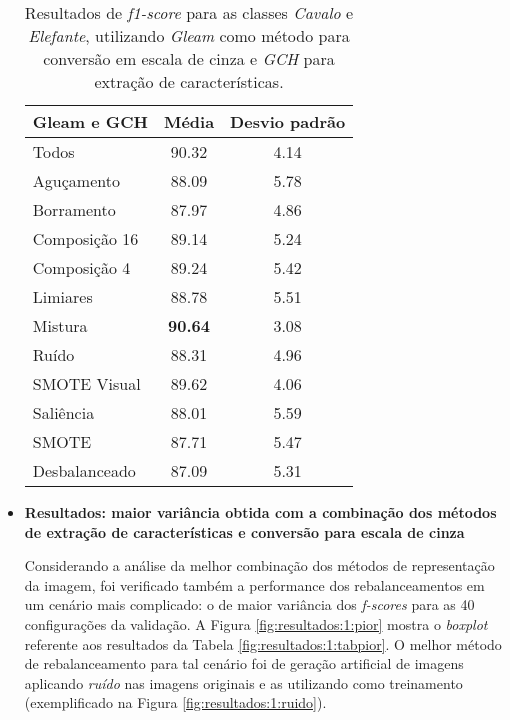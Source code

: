 \begin{itemize}
\begin{table}[!htbp]
\centering
\caption{Resultados de \textit{f1-score} para as classes \emph{Cavalo} e \emph{Elefante}, utilizando \emph{Gleam} como método para conversão em escala de cinza e \emph{GCH} para extração de características.}
\label{fig:resultados:1:tabmelhor}
\begin{tabular}{|l|c|c|}
\hline
\textbf{Gleam e GCH} & \textbf{Média} & \textbf{Desvio padrão} \\ \hline
Todos                & 90.32          & 4.14                   \\ \hline
Aguçamento           & 88.09          & 5.78                   \\ \hline
Borramento           & 87.97          & 4.86                   \\ \hline
Composição 16        & 89.14          & 5.24                   \\ \hline
Composição 4         & 89.24          & 5.42                   \\ \hline
Limiares             & 88.78          & 5.51                   \\ \hline
Mistura              & \textbf{90.64} & 3.08          \\ \hline
Ruído                & 88.31          & 4.96                   \\ \hline
SMOTE Visual         & 89.62          & 4.06                   \\ \hline
Saliência            & 88.01          & 5.59                   \\ \hline
SMOTE                & 87.71          & 5.47                   \\ \hline
Desbalanceado        & 87.09          & 5.31                   \\ \hline
\end{tabular}
\end{table}


\item[] \textbf{Resultados: maior variância obtida com a combinação dos métodos de extração de características e conversão para escala de cinza}

Considerando a análise da melhor combinação dos métodos de representação da imagem, foi verificado também a performance dos rebalanceamentos em um cenário mais complicado: o de maior variância dos \textit{f-scores} para as 40 configurações da validação. A Figura \ref{fig:resultados:1:pior} mostra o \textit{boxplot} referente aos resultados da Tabela \ref{fig:resultados:1:tabpior}. O melhor método de rebalanceamento para tal cenário foi de geração artificial de imagens aplicando \emph{ruído} nas imagens originais e as utilizando como treinamento (exemplificado na Figura \ref{fig:resultados:1:ruido}).


\end{itemize}
